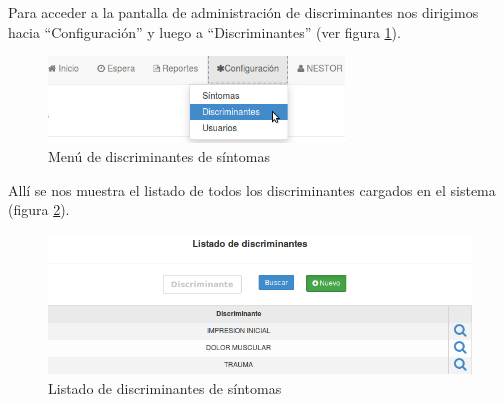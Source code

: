 \label{cap:ABM_discriminantes}
Para acceder a la pantalla de administración de discriminantes nos dirigimos hacia ``Configuración'' y luego a ``Discriminantes'' (ver figura \ref{fig:menu_discriminantes}).
\begin{figure}
\centerline{\includegraphics[width=0.7\textwidth]{menu_discriminantes.png}}
\caption{Menú de discriminantes de síntomas}
\label{fig:menu_discriminantes}
\end{figure}
Allí se nos muestra el listado de todos los discriminantes cargados en el sistema (figura \ref{fig:listado_discriminantes}).
\begin{figure}
\centerline{\includegraphics[width=1\textwidth]{listado_discriminantes.png}}
\caption{Listado de discriminantes de síntomas}
\label{fig:listado_discriminantes}
\end{figure}

